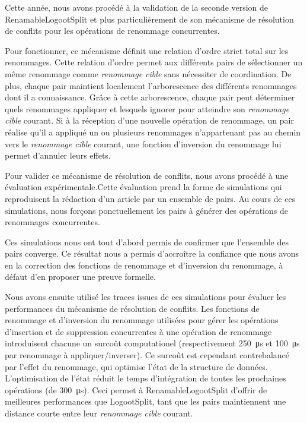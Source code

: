 \documentclass[12pt]{article}
\newcommand{\umicrosecond}[1]{\SI{#1}{\micro\second}}
\begin{document}
Cette année, nous avons procédé à la validation de la seconde version de RenamableLogootSplit et plus particulièrement de son mécanisme de résolution de conflits pour les opérations de renommage concurrentes.

Pour fonctionner, ce mécanisme définit une relation d'ordre strict total sur les renommages.
Cette relation d'ordre permet aux différents pairs de sélectionner un même renommage comme \emph{renommage cible} sans nécessiter de coordination.
De plus, chaque pair maintient localement l'arborescence des différents renommages dont il a connaissance.
Grâce à cette arborescence, chaque pair peut déterminer quels renommages appliquer et lesquels ignorer pour atteindre son \emph{renommage cible} courant.
Si à la réception d'une nouvelle opération de renommage, un pair réalise qu'il a appliqué un ou plusieurs renommages n'appartenant pas au chemin vers le \emph{renommage cible} courant, une fonction d'inversion du renommage lui permet d'annuler leurs effets.

Pour valider ce mécanisme de résolution de conflits, nous avons procédé à une évaluation expérimentale.Cette évaluation prend la forme de simulations qui reproduisent la rédaction d'un article par un ensemble de pairs.
Au cours de ces simulations, nous forçons ponctuellement les pairs à générer des opérations de renommages concurrentes.

Ces simulations nous ont tout d'abord permis de confirmer que l'ensemble des pairs converge.
Ce résultat nous a permis d'accroître la confiance que nous avons en la correction des fonctions de renommage et d'inversion du renommage, à défaut d'en proposer une preuve formelle.

Nous avons ensuite utilisé les traces issues de ces simulations pour évaluer les performances du mécanisme de résolution de conflits.
Les fonctions de renommage et d'inversion du renommage utilisées pour gérer les opérations d'insertion et de suppression concurrentes à une opération de renommage introduisent chacune un surcoût computationel (respectivement \umicrosecond{250} et \umicrosecond{100} par renommage à appliquer/inverser).
Ce surcoût est cependant contrebalancé par l'effet du renommage, qui optimise l'état de la structure de données.
L'optimisation de l'état réduit le temps d'intégration de toutes les prochaines opérations (de \umicrosecond{300}).
Ceci permet à RenamableLogootSplit d'offrir de meilleures performances que LogootSplit, tant que les pairs maintiennent une distance courte entre leur \emph{renommage cible} courant.
\end{document}
